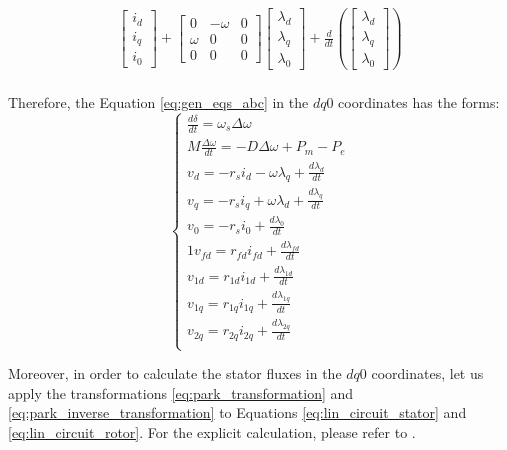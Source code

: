 \begin{equation*}
\begin{aligned}
        \begin{bmatrix}
            i_d \\ i_q \\ i_0
        \end{bmatrix}
        +
        \begin{bmatrix}
            0 & -\omega & 0 \\
            \omega & 0 & 0 \\
            0 & 0 & 0
        \end{bmatrix}\begin{bmatrix}\lambda_d \\ \lambda_q\\ \lambda_0\end{bmatrix}
        +
        \frac{d}{dt} \left(\begin{bmatrix}\lambda_d \\ \lambda_q\\ \lambda_0\end{bmatrix}\right) \\ 
    \end{aligned}
\end{equation*}

Therefore, the Equation \ref{eq:gen_eqs_abc} in the $dq0$ coordinates has the forms:
\begin{equation}
    \begin{cases}
        \frac{d\delta}{dt} = \omega_s \Delta\omega\\
        M\frac{\Delta\omega}{dt} = -D\Delta\omega + P_m - P_e\\
        v_d = -r_s i_d - \omega\lambda_q + \frac{d\lambda_d}{dt}\\
        v_q = -r_s i_q + \omega\lambda_d + \frac{d\lambda_q}{dt}\\
        v_0 = -r_s i_0 + \frac{d\lambda_0}{dt}\\1
        v_{fd} = r_{fd} i_{fd} + \frac{d\lambda_{fd}}{dt}\\
        v_{1d} = r_{1d} i_{1d} + \frac{d\lambda_{1d}}{dt}\\
        v_{1q} = r_{1q} i_{1q} + \frac{d\lambda_{1q}}{dt}\\
        v_{2q} = r_{2q} i_{2q} + \frac{d\lambda_{2q}}{dt}\\
    \end{cases}
    \label{eq:gen_eqs_dq0}
\end{equation}

Moreover, in order to calculate the stator fluxes in the $dq0$ coordinates, let
us apply the transformations \ref{eq:park_transformation} and
\ref{eq:park_inverse_transformation} to Equations \ref{eq:lin_circuit_stator}
and \ref{eq:lin_circuit_rotor}. For the explicit calculation, please refer to
\cite{krause2002analysis}.

